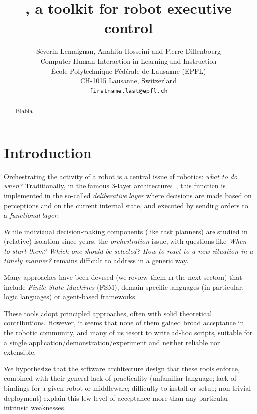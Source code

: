 \documentclass[a4paper, 10pt, conference]{ieeeconf}      %
\title{\LARGE \bf
    \pyRobots, a toolkit for robot executive control
}
\author{Séverin Lemaignan, Anahita Hosseini and Pierre Dillenbourg\\
Computer-Human Interaction in Learning and Instruction \\
École Polytechnique Fédérale de Lausanne (EPFL) \\
CH-1015 Lausanne, Switzerland \\
{\tt\small firstname.last@epfl.ch}
}
\begin{document}
\maketitle
\thispagestyle{empty}
\pagestyle{empty}


\begin{abstract}

    Blabla

\end{abstract}


\section{Introduction}

Orchestrating the activity of a robot is a central issue of robotics: \emph{what
to do when?} Traditionally, in the famous 3-layer architectures~,
this function is implemented in the so-called \emph{deliberative layer} where
decisions are made based on perceptions and on the current internal state, and
executed by sending orders to a \emph{functional layer}.

While individual decision-making components (like task planners) are studied in
(relative) isolation since years, the \emph{orchestration} issue, with questions
like \textit{When to start them? Which one should be selected? How to react to a
new situation in a timely manner?} remains difficult to address in a generic
way.

Many approaches have been devised (we review them in the next section) that
include \emph{Finite State Machines} (FSM), domain-specific languages (in
particular, logic languages) or agent-based frameworks.

These tools adopt principled approaches, often with solid theoretical
contributions. However, it seems that none of them gained broad acceptance in
the robotic community, and many of us resort to write ad-hoc scripts, suitable
for a single application/demonstration/experiment and neither reliable nor
extensible.

We hypothesize that the software architecture design that these tools enforce,
combined with their general lack of practicality (unfamiliar language; lack of
bindings for a given robot or middleware; difficulty to install or setup;
non-trivial deployment) explain this low level of acceptance more than any
particular intrinsic weaknesses.
\end{document}
